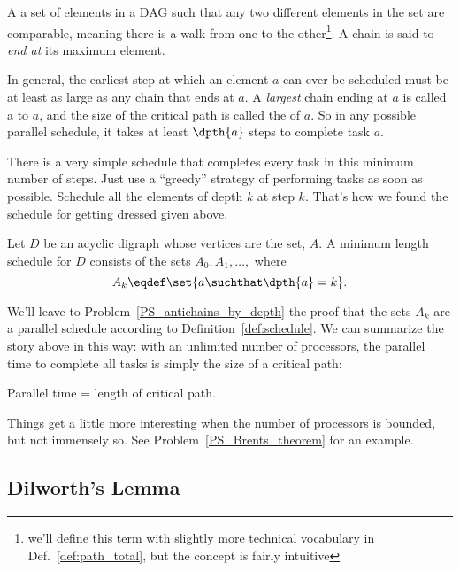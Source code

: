 \begin{definition}
A  a set of elements in a DAG such that any two different
elements in the set are comparable, meaning there is a walk from one
to the other\footnote{we'll define this term with slightly more
  technical vocabulary in Def.~\ref{def:path_total}, but the concept
  is fairly intuitive}.  A chain is said to \emph{end at} its maximum element.
\end{definition}
\fi

In general, the earliest step at which an element $a$ can ever be
scheduled must be at least as large as any chain that ends at $a$.  A
\emph{largest} chain ending at $a$ is called a  to
$a$, and the size of the critical path is called the  of
$a$.  So in any possible parallel schedule, it takes at least
$\dpth{a}$ steps to complete task $a$.

There is a very simple schedule that completes every task in this
minimum number of steps.  Just use a ``greedy'' strategy of performing
tasks as soon as possible.  Schedule all the elements of depth
$k$ at step $k$.  That's how we found the schedule for getting dressed
given above.

\begin{theorem}\label{thm:parallel-time}
Let $D$ be an acyclic digraph whose vertices are the set, $A$.  A minimum length
schedule for $D$ consists of the sets $A_0, A_1,\dots,$ where
\[
A_k \eqdef \set{a \suchthat \dpth{a} =k}.
\]
\end{theorem}

We'll leave to Problem~\ref{PS_antichains_by_depth} the proof that the
sets $A_k$ are a parallel schedule according to
Definition~\ref{def:schedule}.  We can summarize the story above in
this way: with an unlimited number of processors, the parallel time to
complete all tasks is simply the size of a critical path:

\begin{corollary}\label{cor:critical-path-time}
Parallel time = length of critical path.
\end{corollary}

Things get a little more interesting when the number of processors is
bounded, but not immensely so. See Problem~\ref{PS_Brents_theorem} for
an example.

\subsection{Dilworth's Lemma}\label{dilworth_subsec}

